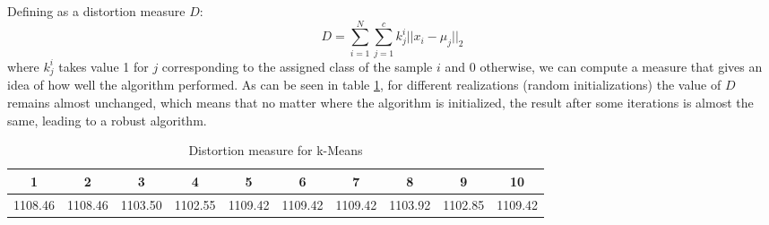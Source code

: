 \documentclass[12pt]{article}
\begin{document}
Defining as a distortion measure $D$:
$$ D = \sum\limits_{i=1}^{N}\sum\limits_{j=1}^{c}k_j^i||x_i-\mu_j||_2 $$
where $k_j^i$ takes value 1 for $j$ corresponding to the assigned class of the sample $i$ and 0 otherwise, we can compute a measure that gives an idea of how well the algorithm performed. As can be seen in table \ref{tab:kmeansdistortion}, for different realizations (random initializations) the value of $D$ remains almost unchanged, which means that no matter where the algorithm is initialized, the result after some iterations is almost the same, leading to a robust algorithm.
\begin{table}[h!]
\centering
	\begin{tabular}{|c|c|c|c|c|c|c|c|c|c|} 
	\hline
	\cellcolor[gray]{0.7} 1 & \cellcolor[gray]{0.7} 2 & \cellcolor[gray]{0.7} 3 & \cellcolor[gray]{0.7} 4 & \cellcolor[gray]{0.7} 5 & \cellcolor[gray]{0.7} 6 & \cellcolor[gray]{0.7} 7 & \cellcolor[gray]{0.7} 8 & \cellcolor[gray]{0.7} 9 & \cellcolor[gray]{0.7} 10 \\ \hline
	1108.46 & 1108.46 & 1103.50 & 1102.55 & 1109.42 & 1109.42 & 1109.42 & 1103.92 & 1102.85 & 1109.42\\ \hline
	\end{tabular} 
	\caption{Distortion measure for k-Means}
	\label{tab:kmeansdistortion}
\end{table}
\end{document}
